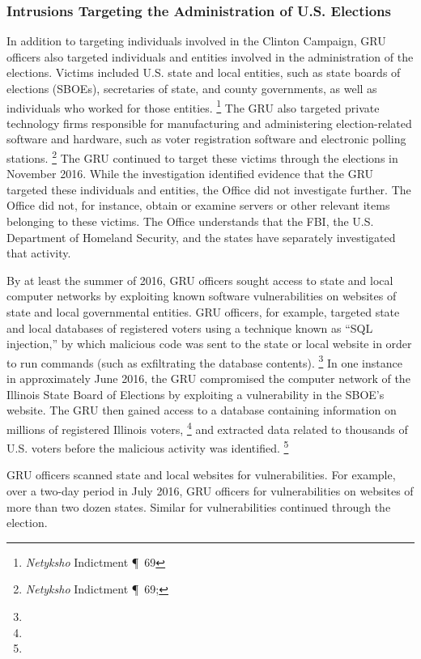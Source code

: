 \subsubsection{Intrusions Targeting the Administration of U.S. Elections}

In addition to targeting individuals involved in the Clinton Campaign, GRU officers also targeted individuals and entities involved in the administration of the elections.
Victims included U.S. state and local entities, such as state boards of elections (SBOEs), secretaries of state, and county governments, as well as individuals who worked for those entities.%
\footnote{\textit{Netyksho} Indictment \P~69}
The GRU also targeted private technology firms responsible for manufacturing and administering election-related software and hardware, such as voter registration software and electronic polling stations.%
\footnote{\textit{Netyksho} Indictment \P~69; }
The GRU continued to target these victims through the elections in November 2016.
While the investigation identified evidence that the GRU targeted these individuals and entities, the Office did not investigate further.
The Office did not, for instance, obtain or examine servers or other relevant items belonging to these victims.
The Office understands that the FBI, the U.S. Department of Homeland Security, and the states have separately investigated that activity.

By at least the summer of 2016, GRU officers sought access to state and local computer networks by exploiting known software vulnerabilities on websites of state and local governmental entities.
GRU officers, for example, targeted state and local databases of registered voters using a technique known as ``SQL injection,'' by which malicious code was sent to the state or local website in order to run commands (such as exfiltrating the database contents).%
\footnote{}
In one instance in approximately June 2016, the GRU compromised the computer network of the Illinois State Board of Elections by exploiting a vulnerability in the SBOE's website.
The GRU then gained access to a database containing information on millions of registered Illinois voters,%
\footnote{}
and extracted data related to thousands of U.S. voters before the malicious activity was identified.%
\footnote{}

GRU officers  scanned state and local websites for vulnerabilities.
For example, over a two-day period in July 2016, GRU officers  for vulnerabilities on websites of more than two dozen states.
Similar  for vulnerabilities continued through the election.

